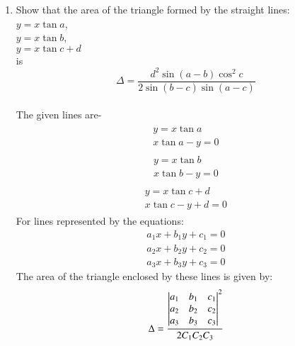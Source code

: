 \documentclass[journal,12pt,twocolumn]{IEEEtran}
\renewcommand\thesection{\arabic{section}}
\begin{document}
\newpage
\bigskip
\renewcommand{\thefigure}{\theenumi}
\renewcommand{\thetable}{\theenumi}
\renewcommand{\theequation}{\theenumi}
\begin{enumerate}[label=\thesection.\arabic*.,ref=\thesection.\theenumi]
\section{PROBLEM}
\item Show that the area of the triangle formed by the straight lines: \\
$y=x\tan a$, \\$y=x\tan b$, \\$y=x\tan c + d$ \\is $$\Delta=\frac{d^2 \sin \left ( a-b \right )\cos^{2}c }{2 \sin\left ( b-c \right )\sin \left ( a-c \right ) }$$\\
\solution
The given lines are-
\begin{align}\label{eq:l1}
\begin{split}
y=x\tan a \\ x\tan a-y=0  
\end{split}
\end{align}
\begin{align}\label{eq:l2}
\begin{split}
y=x\tan b \\ x\tan b-y=0  
\end{split}
\end{align}
\begin{align}\label{eq:l3}
\begin{split}
y=x\tan c + d \\ x\tan c-y + d=0  
\end{split} 
\end{align}
For lines represented by the equations:
\begin{align}
a_{1}x+b_{1}y+c_{1}=0
\end{align}
\begin{align}
a_{2}x+b_{2}y+c_{2}=0
\end{align}
\begin{align}
a_{3}x+b_{3}y+c_{3}=0
\end{align}
The area of the triangle enclosed by these lines is given by:
\begin{align}\label{eq:area}
\Delta=\frac{\begin{vmatrix}a_{1}& b_{1} & c_{1}\\ a_{2} & b_{2} & c_{2}\\ a_{3} & b_{3} & c_{3}\end{vmatrix}^2}{ 2C_{1}C_{2}C_{3}}
\end{align}\\

\end{enumerate}
\end{document}
